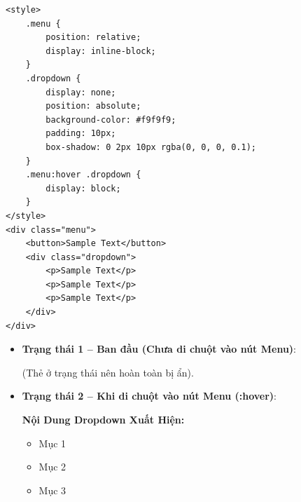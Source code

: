 \begin{codeWindow}
\begin{lstlisting}[language=HTML5]
<style>
    .menu {
        position: relative;
        display: inline-block;
    }
    .dropdown {
        display: none;
        position: absolute;
        background-color: #f9f9f9;
        padding: 10px;
        box-shadow: 0 2px 10px rgba(0, 0, 0, 0.1);
    }
    .menu:hover .dropdown {
        display: block;
    }
</style>
<div class="menu">
    <button>Sample Text</button>
    <div class="dropdown">
        <p>Sample Text</p>
        <p>Sample Text</p>
        <p>Sample Text</p>
    </div>
</div>
\end{lstlisting}
\end{codeWindow}

\begin{browserWindow}
\begin{itemize}[leftmargin=1.5em, itemsep=3pt, parsep=0pt]
    \item \textbf{Trạng thái 1 -- Ban đầu (Chưa di chuột vào nút Menu)}:
    \par\vspace{2pt}
    \tcbox[on line, arc=3pt, colback=gray!10, colframe=gray!40, boxrule=0.8pt, boxsep=3pt]{%
        \small\sffamily\bfseries [ Menu ]%
    }
    \quad (Thẻ  ở trạng thái  nên hoàn toàn bị ẩn).
    \par\vspace{5pt}
    \item \textbf{Trạng thái 2 -- Khi di chuột vào nút Menu (:hover)}:
    \par\vspace{2pt}
    \par\vspace{4pt}
    \begin{tcolorbox}[arc=4pt, colback=primaryBlue!5, colframe=primaryBlue!30, boxrule=0.8pt, top=6pt, bottom=6pt, left=10pt, right=10pt]
      \sffamily\small\bfseries\color{primaryBlue} Nội Dung Dropdown Xuất Hiện:
      \begin{itemize}[leftmargin=1.2em, itemsep=1pt]
          \item Mục 1
          \item Mục 2
          \item Mục 3
      \end{itemize}
    \end{tcolorbox}
\end{itemize}
\end{browserWindow}


